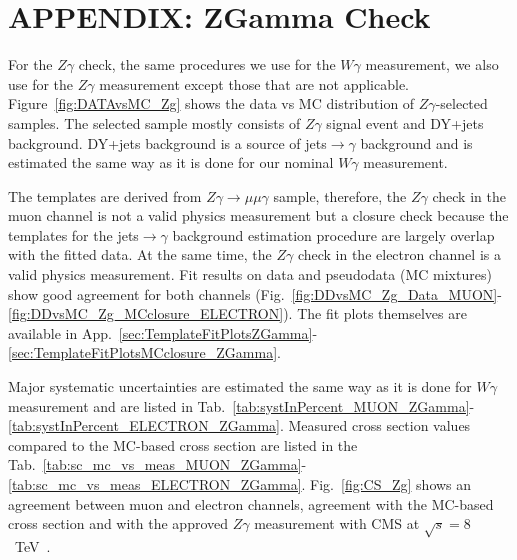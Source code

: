 \section{APPENDIX: ZGamma Check}
\label{sec:ZgCheck}

For the $Z\gamma$ check, the same procedures we use for the $W\gamma$ measurement, we also use for the $Z\gamma$ measurement except those that are not applicable. Figure~\ref{fig:DATAvsMC_Zg} shows the data vs MC distribution of $Z\gamma$-selected samples. The selected sample mostly consists of $Z\gamma$ signal event and DY+jets background. DY+jets background is a source of jets$\rightarrow\gamma$ background and is estimated the same way as it is done for our nominal $W\gamma$ measurement.  

The templates are derived from $Z\gamma\rightarrow\mu\mu\gamma$ sample, therefore, the $Z\gamma$ check in the muon channel is not a valid physics measurement but a closure check because the templates for the jets$\rightarrow\gamma$ background estimation procedure are largely overlap with the fitted data. At the same time, the $Z\gamma$ check in the electron channel is a valid physics measurement. Fit results on data and pseudodata (MC mixtures) show good agreement for both channels (Fig.~\ref{fig:DDvsMC_Zg_Data_MUON}-\ref{fig:DDvsMC_Zg_MCclosure_ELECTRON}). The fit plots themselves are available in App.~\ref{sec:TemplateFitPlotsZGamma}-\ref{sec:TemplateFitPlotsMCclosure_ZGamma}.

Major systematic uncertainties are estimated the same way as it is done for $W\gamma$ measurement and are listed in Tab.~\ref{tab:systInPercent_MUON_ZGamma}-\ref{tab:systInPercent_ELECTRON_ZGamma}. Measured cross section values compared to the MC-based cross section are listed in the Tab.~\ref{tab:sc_mc_vs_meas_MUON_ZGamma}-\ref{tab:sc_mc_vs_meas_ELECTRON_ZGamma}. Fig.~\ref{fig:CS_Zg} shows an agreement between muon and electron channels, agreement with the MC-based cross section and with the approved $Z\gamma$ measurement with CMS at $\sqrt{s}=8$~TeV~\cite{ref_Zg8TeV}.


